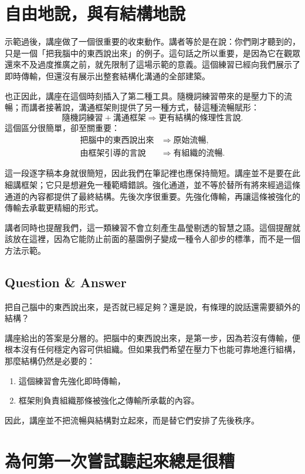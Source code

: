 \section{自由地說，與有結構地說}

示範過後，講座做了一個很重要的收束動作。講者等於是在說：你們剛才聽到的，只是一個「把我腦中的東西說出來」的例子。這句話之所以重要，是因為它在觀眾還來不及過度推廣之前，就先限制了這場示範的意義。這個練習已經向我們展示了即時傳輸，但還沒有展示出整套結構化溝通的全部建築。

也正因此，講座在這個時刻插入了第二種工具。隨機詞練習帶來的是壓力下的流暢；而講者接著說，溝通框架則提供了另一種方式，替這種流暢賦形：
\begin{equation}
\text{隨機詞練習} + \text{溝通框架} \Longrightarrow \text{更有結構的條理性言說}.
\end{equation}
這個區分很簡單，卻至關重要：
\begin{align}
\text{把腦中的東西說出來} &\Longrightarrow \text{原始流暢},\\
\text{由框架引導的言說} &\Longrightarrow \text{有組織的流暢}.
\end{align}

這一段逐字稿本身就很簡短，因此我們在筆記裡也應保持簡短。講座並不是要在此細講框架；它只是想避免一種範疇錯誤。強化通道，並不等於替所有將來經過這條通道的內容都提供了最終結構。先後次序很重要。先強化傳輸，再讓這條被強化的傳輸去承載更精細的形式。

講者同時也提醒我們，這一類練習不會立刻產生晶瑩剔透的智慧之語。這個提醒就該放在這裡，因為它能防止前面的墓園例子變成一種令人卻步的標準，而不是一個方法示範。

\subsection{Question \& Answer}

把自己腦中的東西說出來，是否就已經足夠？還是說，有條理的說話還需要額外的結構？

講座給出的答案是分層的。把腦中的東西說出來，是第一步，因為若沒有傳輸，便根本沒有任何穩定內容可供組織。但如果我們希望在壓力下也能可靠地進行組構，那麼結構仍然是必要的：
\begin{enumerate}
\item 這個練習會先強化即時傳輸，
\item 框架則負責組織那條被強化之傳輸所承載的內容。
\end{enumerate}
因此，講座並不把流暢與結構對立起來，而是替它們安排了先後秩序。

\section{為何第一次嘗試聽起來總是很糟}

